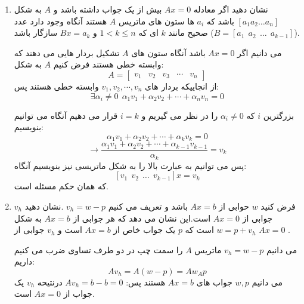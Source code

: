 \documentclass{article}
\begin{document}
\begin{enumerate}
\begin{حل}
	 	\end{حل}
	 \item 
	 نشان دهید اگر معادله 
	 $Ax=0$
	بیش از یک جواب داشته باشد و 
	 $A$
	 به شکل 
	 $[a_1 a_2 \ldots a_n]$
	باشد که 
	 $a_i$
	 ها ستون های ماتریس 
	 $A$
	 هستند آنگاه وجود دارد عدد صحیح مانند 
	 $k$
	 ای که 
	 $1<k\le n$
	 و 
	 $Bx=a_k$
	 سازگار باشد
	 ($B=[a_1\ \ a_2 \ \ \ldots \ \ a_{k-1}]$).
	 \begin{حل}
	 	می دانیم اگر 
	 	$Ax=0$
	 	باشد آنگاه ستون های 
	 	$A$
	 	تشکیل بردار هایی می دهند که وابسته خطی هستند فرض کنیم 
	 	$A$
	 	به شکل:
	 	$$A=\begin{bmatrix}
	 	v_1&v_2&v_3&\cdots&v_n
	 	\end{bmatrix}$$
	 	از انجاییکه بردار های $v_1,v_2,\cdots,v_n$ وابسته خطی هستند پس:
	 	$$\exists \alpha_i\neq0 \ \ \alpha_1v_1+\alpha_2v_2+\cdots+\alpha_nv_n=0$$
	 	
	 	بزرگترین $i$ که $\alpha_i\neq0$ را در نظر می گیریم و 
	 	$i=k$
	 	قرار می دهیم آنگاه می توانیم بنویسیم:
	 	$$\alpha_1v_1+\alpha_2v_2+\cdots+\alpha_kv_k=0$$
	 	$$\longrightarrow \frac{\alpha_1v_1+\alpha_2v_2+\cdots+\alpha_{k-1}v_{k-1}}{\alpha_k}=v_k$$
	 	پس می توانیم به عبارت بالا را به شکل ماتریسی نیز بنویسیم آنگاه:
	 	$$[v_1\ \ v_2 \ \ \ldots \ \ v_{k-1}]x=v_k$$
	 	که همان حکم مسئله است.
	 	
	 \end{حل}
	 \item 
	 فرض کنید 
	 $w$
	حوابی از 
	$Ax=b$ 
	باشد و تعریف می کنیم 
	$v_h=w-p$
	.نشان دهید 
	$v_h$
	جوابی از 
	$Ax=0$
	است.این نشان می دهد که هر جوابی از 
	$Ax=b$
	به شکل 
	$w=p+v_h$
	است که 
	$p$
	یک جواب خاص از 
	$Ax=b$
	 است و 
	 $v_h$
	 جوابی از
	 $Ax=0$
	 .
	 \begin{حل}
	 	می دانیم 
	 	$v_h=w-p$
	 	ماتریس 
	 	$A$
	 	را سمت چپ در دو طرف تساوی ضرب می کنیم داریم:
	 	$$Av_h=A(w-p)=Aw_Ap$$
	 	می دانیم 
	 	$w,p$
	 	جواب های 
	 	$Ax=b$
	 	هستند پس:
	 	$Av_h=b-b=0$
	 	درنتیحه 
	 	$v_h$
	 	یک جواب از 
	 	$Ax=0$
	 	است.
	 \end{حل}
	 
\end{enumerate}
\end{document}
